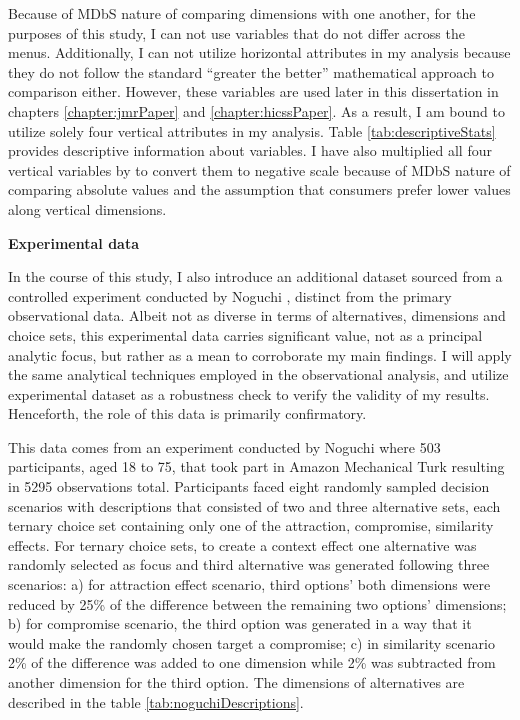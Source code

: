 \documentclass[a4paper,12pt]{article}
\newcommand{\citeyearonly}[1]{\citeyearpar{#1}}
\begin{document}
Because of MDbS nature of comparing dimensions with one another, for the purposes of this study, I can not use variables that do not differ across the menus. Additionally, I can not utilize horizontal attributes in my analysis because they do not follow the standard ``greater the better'' mathematical approach to comparison either. However, these variables are used later in this dissertation in chapters \ref{chapter:jmrPaper} and \ref{chapter:hicssPaper}. As a result, I am bound to utilize solely four vertical attributes in my analysis. Table \ref{tab:descriptiveStats} provides descriptive information about variables. I have also multiplied all four vertical variables by  to convert them to negative scale because of MDbS nature of comparing absolute values and the assumption that consumers prefer lower values along vertical dimensions.

\textbf{Experimental data}

In the course of this study, I also introduce an additional dataset sourced from a controlled experiment conducted by Noguchi \citeyearonly{noguchi2018multialternative}, distinct from the primary observational data. Albeit not as diverse in terms of alternatives, dimensions and choice sets, this experimental data carries significant value, not as a principal analytic focus, but rather as a mean to corroborate my main findings. I will apply the same analytical techniques employed in the observational analysis, and utilize experimental dataset as a robustness check to verify the validity of my results. Henceforth, the role of this data is primarily confirmatory.

This data comes from an experiment conducted by Noguchi \citeyearonly{noguchi2018multialternative} where 503 participants, aged 18 to 75, that took part in Amazon Mechanical Turk resulting in 5295 observations total. Participants faced eight randomly sampled decision scenarios with descriptions that consisted of two and three alternative sets, each ternary choice set containing only one of the attraction, compromise, similarity effects. For ternary choice sets, to create a context effect one alternative was randomly selected as focus and third alternative was generated following three scenarios: a) for attraction effect scenario, third options' both dimensions were reduced by 25\% of the difference between the remaining two options' dimensions; b) for compromise scenario, the third option was generated in a way that it would make the randomly chosen target a compromise; c) in similarity scenario 2\% of the difference was added to one dimension while 2\% was subtracted from another dimension for the third option. The dimensions of alternatives are described in the table \ref{tab:noguchiDescriptions}.
\end{document}
